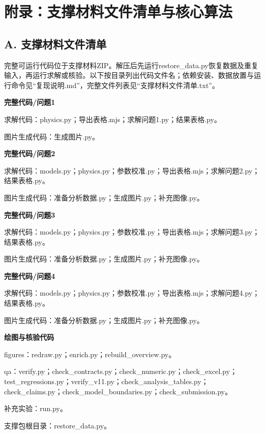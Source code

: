 \section*{附录：支撑材料文件清单与核心算法}\label{appendix:start}
\subsection*{A. 支撑材料文件清单}
完整可运行代码位于支撑材料ZIP。解压后先运行restore\_data.py恢复数据及重复输入，再运行求解或核验。以下按目录列出代码文件名；依赖安装、数据放置与运行命令见“复现说明.md”，完整文件列表见“支撑材料文件清单.txt”。

\noindent\textbf{完整代码/问题1}\par
求解代码：physics.py；导出表格.mjs；求解问题1.py；结果表格.py。\par
图片生成代码：生成图片.py。\par
\vspace{0.4em}
\noindent\textbf{完整代码/问题2}\par
求解代码：models.py；physics.py；参数校准.py；导出表格.mjs；求解问题2.py；结果表格.py。\par
图片生成代码：准备分析数据.py；生成图片.py；补充图像.py。\par
\vspace{0.4em}
\noindent\textbf{完整代码/问题3}\par
求解代码：models.py；physics.py；参数校准.py；导出表格.mjs；求解问题3.py；结果表格.py。\par
图片生成代码：准备分析数据.py；生成图片.py；补充图像.py。\par
\vspace{0.4em}
\noindent\textbf{完整代码/问题4}\par
求解代码：models.py；physics.py；参数校准.py；导出表格.mjs；求解问题4.py；结果表格.py。\par
图片生成代码：准备分析数据.py；生成图片.py；补充图像.py。\par
\vspace{0.4em}

\noindent\textbf{绘图与核验代码}\par
figures：redraw.py；enrich.py；rebuild\_overview.py。\par
{\raggedright qa：verify.py；check\_contracts.py；check\_numeric.py；check\_excel.py；test\_regressions.py；verify\_v11.py；check\_analysis\_tables.py；check\_claims.py；check\_model\_boundaries.py；check\_submission.py。\par}
补充实验：run.py。\par
支撑包根目录：restore\_data.py。\par

